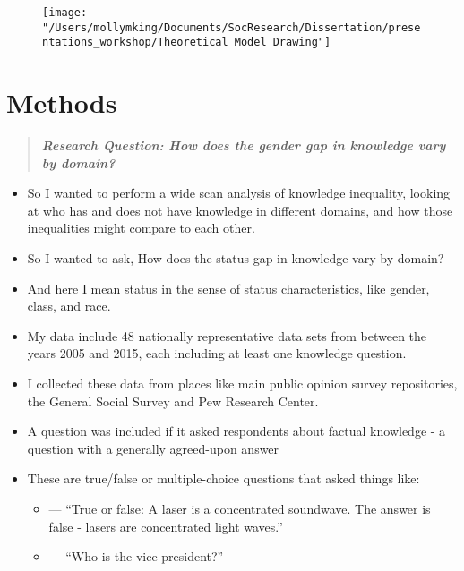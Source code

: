 \documentclass[]{article}
\begin{document}
    \begin{figure}[htb]
      \begin{center}
        \texttt{[image: "/Users/mollymking/Documents/SocResearch/Dissertation/presentations\_workshop/Theoretical Model Drawing"]}
      \end{center}
    \end{figure}

\newpage

\section{Methods}\label{methods}

\begin{quote}
\emph{\textbf{Research Question: How does the gender gap in knowledge vary by domain?}}
\end{quote}

\begin{itemize}
   \item{So I wanted to perform a wide scan analysis of knowledge inequality, looking at who has and does not have knowledge in different domains, and how those inequalities might compare to each other.}
  \item{So I wanted to ask, How does the status gap in knowledge vary by domain?}
  \item{And here I mean status in the sense of status characteristics, like gender, class, and race.}
\end{itemize}

\begin{itemize}
  \item{My data include 48 nationally representative data sets from between the years 2005 and 2015, each including at least one knowledge question.}
  \item{I collected these data from places like main public opinion survey repositories, the General Social Survey and Pew Research Center.}
  \item{A question was included if it asked respondents about factual knowledge  - a question with a generally agreed-upon answer}
  \item{These are true/false or multiple-choice questions that asked things like:}
    \begin{itemize}
      \item{--- ``True or false: A laser is a concentrated soundwave. The answer is false - lasers are concentrated light waves.''}
      \item{--- ``Who is the vice president?''}
    \end{itemize}
\end{itemize}
\end{document}
